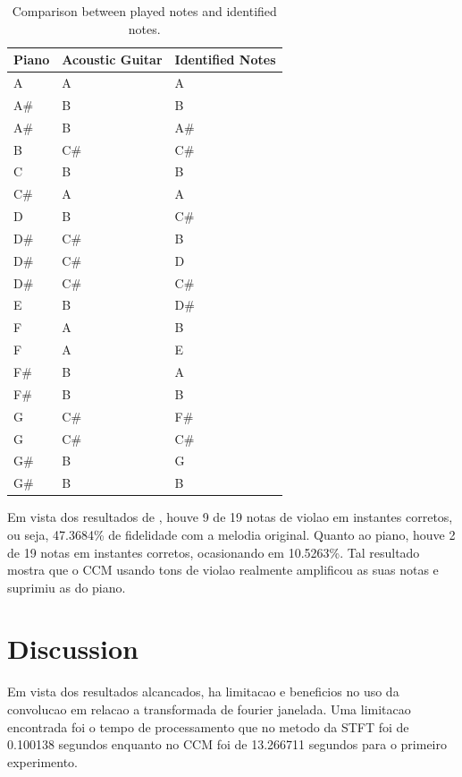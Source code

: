 \documentclass{article}
\begin{document}
	\begin{table}[h]
	 \begin{center}
	 \begin{tabular}{|l|l|l|}
	  \hline
	  Piano & Acoustic Guitar & Identified Notes \\
	  \hline
			  A & A &  A \\
		A\# &  B &  B \\
		    A\# &  B &    A\# \\
		    B  &   C\# &  C\# \\
		    C   &  B  &   B \\
		    C\# &  A   &  A \\
		    D   &  B   &  C\# \\
		    D\# &  C\# &  B \\
		    D\# &  C\# &  D \\
		    D\# &  C\# &  C\# \\
		    E   &  B  &   D\# \\
		    F   &  A   &  B \\
		    F   &  A  &   E \\
		    F\# &  B  &   A \\
		    F\# &  B   &  B \\
		    G   &  C\# &  F\# \\
		    G   &  C\# &  C\# \\
		    G\# &  B   &  G \\
		    G\# &  B  &   B \\
	  \hline
	 \end{tabular}
	\end{center}
	 \caption{Comparison between played notes and identified notes.}
	 \label{tab:table-2-ccm-violao}
	\end{table}

	\newpage
	Em vista dos resultados de , houve 9 de 19 notas de violao em instantes corretos, ou seja, 47.3684\% de fidelidade com a melodia original. Quanto ao piano, houve 2 de 19 notas em instantes corretos, ocasionando em 10.5263\%. Tal resultado mostra que o CCM usando tons de violao realmente amplificou as suas notas e suprimiu as do piano.


\section{Discussion}\label{sec:discussion}

	Em vista dos resultados alcancados, ha limitacao e beneficios no uso da convolucao em relacao a transformada de fourier janelada. Uma limitacao encontrada foi o tempo de processamento que no metodo da STFT foi de 0.100138 segundos enquanto no CCM foi de 13.266711 segundos para o primeiro experimento.
\end{document}
